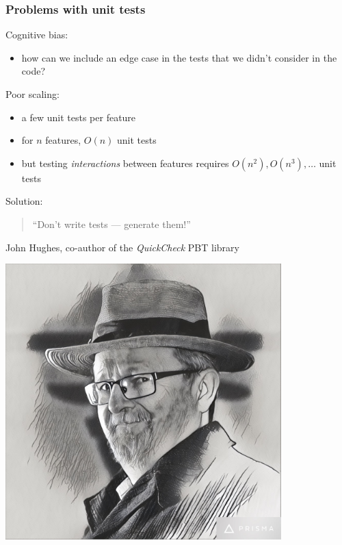 \documentclass{beamer}
\begin{document}
\begin{frame}[fragile]
  \frametitle{Problems with unit tests}

  Cognitive bias:
  \begin{itemize}
  \item how can we include an edge case in the tests
    that we didn't consider in the code?
  \end{itemize}
  \medskip
  
  Poor scaling:
  \begin{itemize}
  \item a few unit tests per feature
  \item for $n$ features, $O(n)$ unit tests
  \item but testing \emph{interactions} between features requires $O(n^2),
    O(n^3), \ldots$ unit tests
  \end{itemize}
  \pause
  \bigskip
  

    \begin{minipage}{0.7\textwidth}
      Solution:
      \medskip
      
      \begin{quote}
        ``Don't write tests 
        --- generate them!''
      \end{quote}
      John Hughes, co-author of the \emph{QuickCheck}
      PBT library
    \end{minipage}
    \begin{minipage}{0.25\textwidth}
      \hfill
      \includegraphics[width=0.8\textwidth]{images/john-hughes}
    \end{minipage}  
\end{frame}
\end{document}
